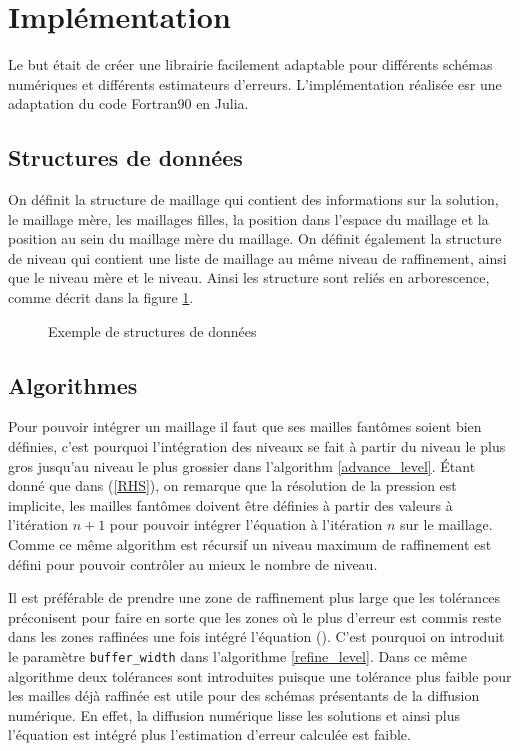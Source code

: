 \documentclass[12pt]{article}
\begin{document}
\section{Implémentation}
Le but était de créer une librairie facilement adaptable pour différents schémas numériques et différents estimateurs d'erreurs. L'implémentation réalisée esr une adaptation du code Fortran90 \cite{Hawke18} en Julia.

\subsection{Structures de données}  
On définit la structure de maillage qui contient des informations sur la solution, le maillage mère, les maillages filles, la position dans l'espace du maillage et la position au sein du maillage mère du maillage.
On définit également la structure de niveau qui contient une liste de maillage au même niveau de raffinement, ainsi que le niveau mère et le niveau. 
Ainsi les structure sont reliés en arborescence, comme décrit dans la figure \ref{grid_hierarchy}.

\begin{figure}[htbp]
    \centering
    
    \caption{Exemple de structures de données}
    \label{grid_hierarchy}
\end{figure}

\subsection{Algorithmes}

Pour pouvoir intégrer un maillage il faut que ses mailles fantômes soient bien définies, c'est pourquoi l'intégration des niveaux se fait à partir du niveau le plus gros jusqu'au niveau le plus grossier dans l'algorithm \ref{advance_level}.
Étant donné que dans (\ref{RHS}), on remarque que la résolution de la pression est implicite, les mailles fantômes doivent être définies à partir des valeurs à l'itération \(n+1\) pour pouvoir intégrer l'équation à l'itération \(n\) sur le maillage. 
Comme ce même algorithm est récursif un niveau maximum de raffinement est défini pour pouvoir contrôler au mieux le nombre de niveau.

\begin{algorithm}
    \caption{Intégration d'un niveau}
    \label{advance_level}
    
\end{algorithm}

Il est préférable de prendre une zone de raffinement plus large que les tolérances préconisent pour faire en sorte que les zones où le plus d'erreur est commis reste dans les zones raffinées une fois intégré l'équation (\cite{Löhner86}).
C'est pourquoi on introduit le paramètre \texttt{buffer\_width} dans l'algorithme \ref{refine_level}.
Dans ce même algorithme deux tolérances sont introduites puisque une tolérance plus faible pour les mailles déjà raffinée est utile pour des schémas présentants de la diffusion numérique.
En effet, la diffusion numérique lisse les solutions et ainsi plus l'équation est intégré plus l'estimation d'erreur calculée est faible.
\end{document}
